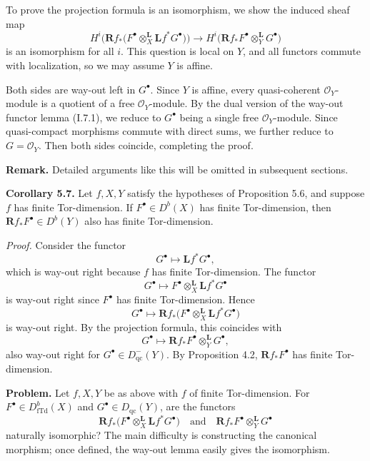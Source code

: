 \setcounter{page}{107}
To prove the projection formula is an isomorphism, we show the induced sheaf map
\[
H^i\Big(\mathbf{R}f_*\big(F^\bullet\otimes^{\mathbf{L}}_X \mathbf{L}f^*G^\bullet\big)\Big)
\to
H^i\big(\mathbf{R}f_*F^\bullet\otimes^{\mathbf{L}}_Y G^\bullet\big)
\]
is an isomorphism for all $i$. This question is local on $Y$, and all functors commute with localization, so we may assume $Y$ is affine.

Both sides are way-out left in $G^\bullet$. Since $Y$ is affine, every quasi-coherent $\mathcal{O}_Y$-module is a quotient of a free $\mathcal{O}_Y$-module. By the dual version of the way-out functor lemma (I.7.1), we reduce to $G^\bullet$ being a single free $\mathcal{O}_Y$-module. Since quasi-compact morphisms commute with direct sums, we further reduce to $G=\mathcal{O}_Y$. Then both sides coincide, completing the proof.

\textbf{Remark.} Detailed arguments like this will be omitted in subsequent sections.

\setcounter{page}{108}
\textbf{Corollary 5.7.}
Let $f,X,Y$ satisfy the hypotheses of Proposition 5.6, and suppose $f$ has finite Tor-dimension. If $F^\bullet\in D^b(X)$ has finite Tor-dimension, then $\mathbf{R}f_*F^\bullet\in D^b(Y)$ also has finite Tor-dimension.

\textit{Proof.}
Consider the functor
\[
G^\bullet \mapsto \mathbf{L}f^*G^\bullet,
\]
which is way-out right because $f$ has finite Tor-dimension.
The functor
\[
G^\bullet \mapsto F^\bullet\otimes^{\mathbf{L}}_X\mathbf{L}f^*G^\bullet
\]
is way-out right since $F^\bullet$ has finite Tor-dimension.
Hence
\[
G^\bullet \mapsto \mathbf{R}f_*\big(F^\bullet\otimes^{\mathbf{L}}_X\mathbf{L}f^*G^\bullet\big)
\]
is way-out right. By the projection formula, this coincides with
\[
G^\bullet \mapsto \mathbf{R}f_*F^\bullet\otimes^{\mathbf{L}}_Y G^\bullet,
\]
also way-out right for $G^\bullet\in D_{\mathrm{qc}}^-(Y)$. By Proposition 4.2, $\mathbf{R}f_*F^\bullet$ has finite Tor-dimension.

\setcounter{page}{109}
\textbf{Problem.}
Let $f,X,Y$ be as above with $f$ of finite Tor-dimension.
For $F^\bullet\in D^b_{\mathrm{fTd}}(X)$ and $G^\bullet\in D_{\mathrm{qc}}(Y)$, are the functors
\[
\mathbf{R}f_*\big(F^\bullet\otimes^{\mathbf{L}}_X\mathbf{L}f^*G^\bullet\big)
\quad\text{and}\quad
\mathbf{R}f_*F^\bullet\otimes^{\mathbf{L}}_Y G^\bullet
\]
naturally isomorphic? The main difficulty is constructing the canonical morphism; once defined, the way-out lemma easily gives the isomorphism.

